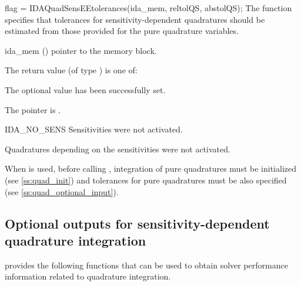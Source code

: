 {
  flag = IDAQuadSensEEtolerances(ida\_mem, reltolQS, abstolQS);
}
{
  The function  specifies that tolerances for
  sensitivity-dependent quadratures should be estimated from those provided for the 
  pure quadrature variables. 
}
{
  \begin{args}
  \item[ida\_mem] ()
    pointer to the {\idas} memory block.
  \end{args}
}
{
  The return value  (of type ) is one of:
  \begin{args}
  \item[\Id{IDA\_SUCCESS}] 
    The optional value has been successfully set.
  \item[\Id{IDA\_MEM\_NULL}]
    The  pointer is .
  \item[IDA\_NO\_SENS]
    Sensitivities were not activated.
  \item[\Id{IDA\_NO\_QUADSENS}] 
    Quadratures depending on the sensitivities were not activated.
  \end{args}
}
{ 
  When   is used, before calling , 
  integration of pure quadratures must be initialized (see \ref{ss:quad_init})
  and tolerances for pure quadratures must be also specified 
  (see \ref{ss:quad_optional_input}).
  
}


\subsection{Optional outputs for sensitivity-dependent quadrature integration}
\label{ss:quad_sens_optional_output}

{\idas} provides the following functions that can be used to obtain solver
performance information related to quadrature integration.

